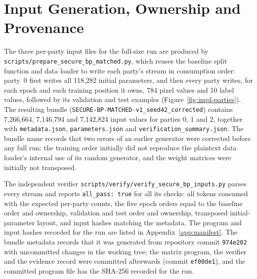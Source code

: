 \section{Input Generation, Ownership and Provenance}\label{sec:impl-provenance}
The three per-party input files for the full-size run are produced by \texttt{scripts/\allowbreak prepare\_\allowbreak secure\_\allowbreak bp\_\allowbreak matched.py}, which reuses the baseline split function and data loader to write each party's stream in consumption order: party~0 first writes all 118{,}282 initial parameters, and then every party writes, for each epoch and each training position it owns, 784 pixel values and 10 label values, followed by its validation and test examples (Figure~\ref{fig:impl-parties}). The resulting bundle (\texttt{SECURE-BP-MATCHED-v1\_seed42\_corrected}) contains 7{,}266{,}664, 7{,}146{,}794 and 7{,}142{,}824 input values for parties 0, 1 and 2, together with \texttt{metadata.json}, \texttt{parameters.json} and \texttt{verification\_summary.json}. The bundle name records that two errors of an earlier generator were corrected before any full run: the training order initially did not reproduce the plaintext data loader's internal use of its random generator, and the weight matrices were initially not transposed.

The independent verifier \texttt{scripts/\allowbreak verify/\allowbreak verify\_\allowbreak secure\_\allowbreak bp\_\allowbreak inputs.py} parses every stream and reports \texttt{all\_pass: true} for all its checks: all tokens consumed with the expected per-party counts, the five epoch orders equal to the baseline order and ownership, validation and test order and ownership, transposed initial-parameter layout, and input hashes matching the metadata. The program and input hashes recorded for the run are listed in Appendix~\ref{app:manifest}. The bundle metadata records that it was generated from repository commit \texttt{974e202} with uncommitted changes in the working tree; the matrix program, the verifier and the evidence record were committed afterwards (commit \texttt{ef00de1}), and the committed program file has the SHA-256 recorded for the run.

